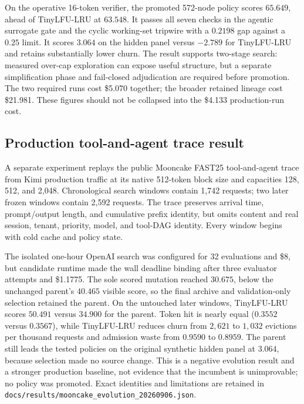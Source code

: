 \documentclass[11pt]{article}
\newcommand{\filepath}[1]{\nolinkurl{#1}}
\begin{document}
On the operative 16-token verifier, the promoted 572-node policy scores \(65.649\),
ahead of TinyLFU-LRU at \(63.548\).  It passes all seven checks in the agentic
surrogate gate and the cyclic working-set tripwire with a \(0.2198\) gap against a
\(0.25\) limit.  It scores \(3.064\) on the hidden panel versus \(-2.789\) for
TinyLFU-LRU and retains substantially lower churn.  The result supports two-stage
search: measured over-cap exploration can expose useful structure, but a separate
simplification phase and fail-closed adjudication are required before promotion.  The
two required runs cost \$5.070 together; the broader retained lineage
cost \$21.981.  These figures should not be collapsed into the \$4.133 production-run
cost.

\subsection{Production tool-and-agent trace result}

A separate experiment replays the public Mooncake FAST25 tool-and-agent trace from Kimi
production traffic at its native 512-token block size and capacities 128, 512, and
2,048.  Chronological search windows contain 1,742 requests; two later frozen windows
contain 2,592 requests.  The trace preserves arrival time, prompt/output length, and
cumulative prefix identity, but omits content and real session, tenant, priority,
model, and tool-DAG identity.  Every window begins with cold cache and policy state.

The isolated one-hour OpenAI search was configured for 32 evaluations and \$8, but
candidate runtime made the wall deadline binding after three evaluator attempts and
\$1.1775.  The sole scored mutation reached $30.675$, below the unchanged parent's
$40.465$ visible score, so the final archive and validation-only selection retained
the parent.  On the untouched later windows, TinyLFU-LRU scores $50.491$ versus
$34.900$ for the parent.  Token hit is nearly equal ($0.3552$ versus $0.3567$),
while TinyLFU-LRU reduces churn from $2{,}621$ to $1{,}032$ evictions per thousand
requests and admission waste from $0.9590$ to $0.8959$.  The parent still leads the
tested policies on the original synthetic hidden panel at $3.064$, because selection
made no source change.  This is a negative evolution result and a stronger production
baseline, not evidence that the incumbent is unimprovable; no policy was promoted.
Exact identities and limitations are retained in
\filepath{docs/results/mooncake\_evolution\_20260906.json}.
\end{document}
